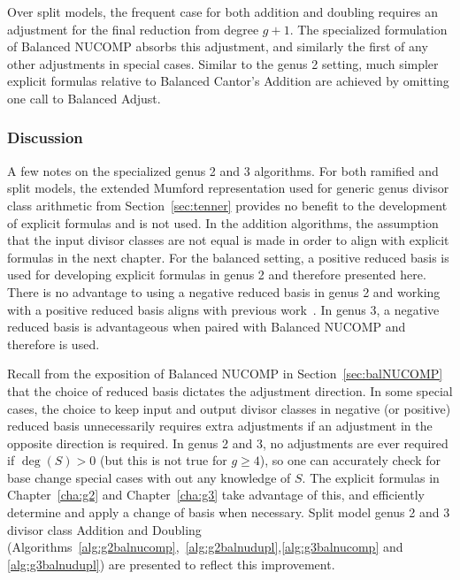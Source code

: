 Over split models, the frequent case for both addition and doubling requires an
adjustment for the final reduction from degree $g+1$. The specialized
formulation of Balanced NUCOMP absorbs this adjustment, and similarly the first
of any other adjustments in special cases. Similar to the genus 2 setting, much
simpler explicit formulas relative to Balanced Cantor's Addition are achieved by
omitting one call to Balanced Adjust. 

\subsubsection{Discussion}
A few notes on the specialized genus 2 and 3 algorithms. For both ramified and
split models, the extended Mumford representation used for generic genus
divisor class arithmetic from Section~\ref{sec:tenner} provides no benefit to
the development of explicit formulas and is not used. In the addition
algorithms, the assumption that the input divisor classes are not equal is made
in order to align with explicit formulas in the next chapter. For the balanced
setting, a positive reduced basis is used for developing explicit formulas in
genus 2 and therefore presented here. There is no advantage to using a negative
reduced basis in genus 2 and working with a positive reduced basis aligns with
previous work~\cite{EricksonJacobsonStein_realg2_2011}. In genus 3, a negative
reduced basis is advantageous when paired with Balanced NUCOMP and therefore is
used.

Recall from the exposition of Balanced NUCOMP in Section~\ref{sec:balNUCOMP}
that the choice of reduced basis dictates the adjustment direction. In some
special cases, the choice to keep input and output divisor classes in negative
(or positive) reduced basis unnecessarily requires extra adjustments if an
adjustment in the opposite direction is required. In genus 2 and 3, no
adjustments are ever required if $\deg(S) > 0$ (but this is not true for $g \geq
4$), so one can accurately check for base change special cases with out any
knowledge of $S$.  The explicit formulas in Chapter~\ref{cha:g2} and
Chapter~\ref{cha:g3} take advantage of this, and efficiently determine and apply
a change of basis when necessary. Split model genus 2 and 3  divisor class
Addition and Doubling
(Algorithms~\ref{alg:g2balnucomp},~\ref{alg:g2balnudupl},\ref{alg:g3balnucomp}
and \ref{alg:g3balnudupl}) are presented to reflect this improvement. 


